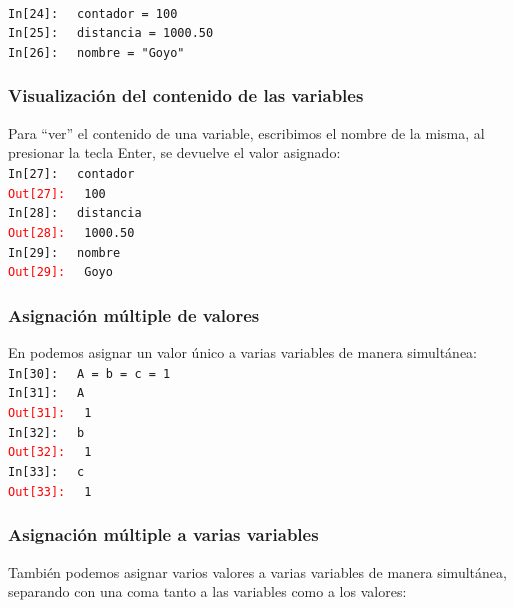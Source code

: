 \documentclass[12pt]{beamer}
\begin{document}
{\begin{frame}[fragile]
\\
\bigskip
\pause
\textcolor{ao}{\texttt{In[24]: }} \verb| contador = 100| \\ \pause
\textcolor{ao}{\texttt{In[25]: }} \verb| distancia = 1000.50| \\ \pause
\textcolor{ao}{\texttt{In[26]: }} \verb| nombre = "Goyo"|
\end{frame}
\begin{frame}[fragile]
\frametitle{Visualización del contenido de las variables}
Para \enquote{ver} el contenido de una variable, escribimos el nombre de la misma, al presionar la tecla Enter, se devuelve el valor asignado:
\\
\bigskip
\pause
\textcolor{ao}{\texttt{In[27]: }} \verb| contador| \\
\pause
\textcolor{red}{\texttt{Out[27]: }} \verb| 100| \\
\pause
\textcolor{ao}{\texttt{In[28]: }} \verb| distancia| \\
\pause
\textcolor{red}{\texttt{Out[28]: }} \verb| 1000.50| \\
\pause
\textcolor{ao}{\texttt{In[29]: }} \verb| nombre| \\
\pause
\textcolor{red}{\texttt{Out[29]: }} \verb| Goyo|
\end{frame}
\begin{frame}[fragile]
\frametitle{Asignación múltiple de valores}
En \python{} podemos asignar un valor único a varias variables de manera simultánea:
\\
\bigskip
\pause
\textcolor{ao}{\texttt{In[30]: }} \verb| A = b = c = 1 | \\
\pause
\textcolor{ao}{\texttt{In[31]: }} \verb| A | \\
\pause
\textcolor{red}{\texttt{Out[31]: }} \verb| 1 | \\
\pause
\textcolor{ao}{\texttt{In[32]: }} \verb| b | \\
\pause
\textcolor{red}{\texttt{Out[32]: }} \verb| 1 | \\
\pause
\textcolor{ao}{\texttt{In[33]: }} \verb| c | \\
\pause
\textcolor{red}{\texttt{Out[33]: }} \verb| 1 |
\end{frame}
\begin{frame}[fragile]
\frametitle{Asignación múltiple a varias variables}
También podemos asignar varios valores a varias variables de manera simultánea, separando con una coma tanto a las variables como a los valores:
\end{frame}
\begin{frame}[fragile]

\end{frame}}
\end{document}
